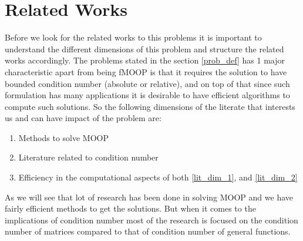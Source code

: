 \chapter{Related Works}
\hspace{1cm}Before we look for the related works to this problems it is important to understand the different dimensions of this problem and structure the related works accordingly. The problems stated in the section \ref{prob_def} has 1 major characteristic apart from being fMOOP is that it requires the solution to have bounded condition number (absolute or relative), and on top of that since such formulation has many applications it is desirable to have efficient algorithms to compute such solutions. So the following dimensions of the literate that interests us and can have impact of the problem are:
\begin{enumerate}
    \item Methods to solve MOOP \label{lit_dim_1}
    \item Literature related to condition number \label{lit_dim_2}
    \item Efficiency in the computational aspects of both \ref{lit_dim_1}, and \ref{lit_dim_2}
\end{enumerate}
As we will see that lot of research has been done in solving MOOP and we have fairly efficient methods to get the solutions. But when it comes to the implications of condition number most of the research is focused on the condition number of matrices compared to that of condition number of general functions.

\newpage
